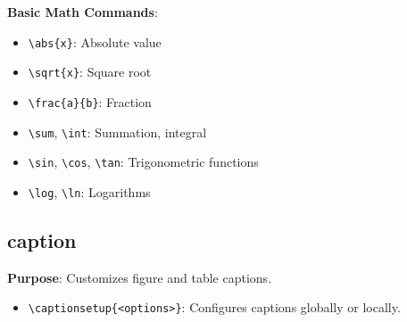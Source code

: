 \documentclass[12pt,twoside]{report}
\begin{document}
\textbf{Basic Math Commands}:
\begin{itemize}
    \item \verb|\abs{x}|: Absolute value
    \item \verb|\sqrt{x}|: Square root
    \item \verb|\frac{a}{b}|: Fraction
    \item \verb|\sum|, \verb|\int|: Summation, integral
    \item \verb|\sin|, \verb|\cos|, \verb|\tan|: Trigonometric functions
    \item \verb|\log|, \verb|\ln|: Logarithms
\end{itemize}

\subsection{caption}
\textbf{Purpose}: Customizes figure and table captions.
\begin{itemize}
    \item \verb|\captionsetup{<options>}|: Configures captions globally or locally.
\end{itemize}
\end{document}
